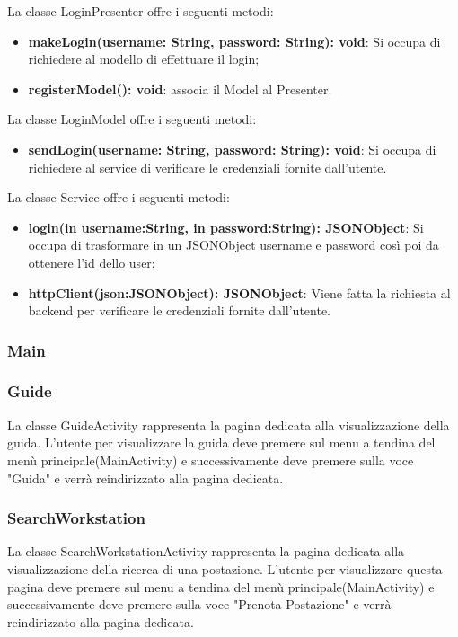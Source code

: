 La classe LoginPresenter offre i seguenti metodi:
\begin{itemize}
	\item \textbf{makeLogin(username: String, password: String): void}: Si occupa di richiedere al modello di effettuare il login; 
	\item \textbf{registerModel(): void}: associa il Model al Presenter.
\end{itemize}

La classe LoginModel offre i seguenti metodi:
\begin{itemize}
	\item \textbf{sendLogin(username: String, password: String): void}: Si occupa di richiedere al service di verificare le credenziali fornite dall'utente. 
\end{itemize}

La classe Service offre i seguenti metodi:
\begin{itemize}
	\item \textbf{login(in username:String, in password:String): JSONObject}: Si occupa di trasformare in un JSONObject username e password così poi da ottenere l'id dello user;
	\item \textbf{httpClient(json:JSONObject): JSONObject}: Viene fatta la richiesta al backend per verificare le credenziali fornite dall'utente.
	
\end{itemize}

\subsubsection{Main}

\subsubsection{Guide}
La classe GuideActivity rappresenta la pagina dedicata alla visualizzazione della guida.
L'utente per visualizzare la guida deve premere sul menu a tendina del menù principale(MainActivity) e successivamente deve premere sulla voce "Guida" e verrà reindirizzato alla pagina dedicata.

\subsubsection{SearchWorkstation}
La classe SearchWorkstationActivity rappresenta la pagina dedicata alla visualizzazione della ricerca di una postazione.
L'utente per visualizzare questa pagina deve premere sul menu a tendina del menù principale(MainActivity) e successivamente deve premere sulla voce "Prenota Postazione" e verrà reindirizzato alla pagina dedicata.

